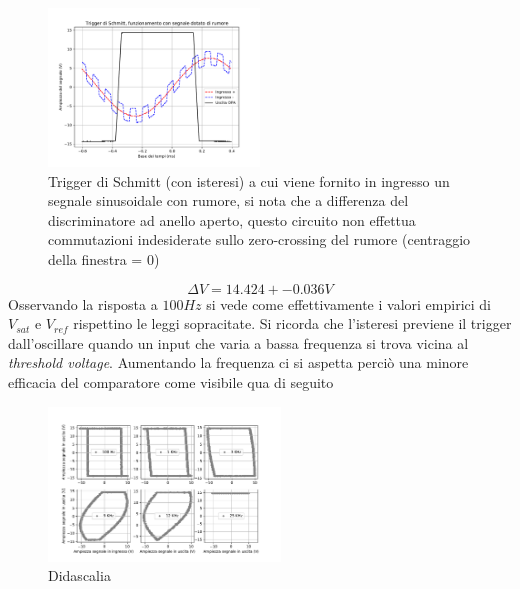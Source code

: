 \documentclass[journal]{IEEEtran}
\begin{document}
\begin{figure}[H]%
\begin {center}
\includegraphics[width=0.50\textwidth]{analysis/output/trigger2.pdf}
\caption{Trigger di Schmitt (con isteresi) a cui viene fornito in ingresso un segnale sinusoidale con rumore, si nota che a differenza del discriminatore ad anello aperto, questo circuito non effettua commutazioni indesiderate sullo zero-crossing del rumore (centraggio della finestra = 0)}
\label{fig:trigger-ok}
\end {center}
\end{figure}


\[\Delta V  = 14.424 +- 0.036  V \]
Osservando la risposta a $100 Hz$ si vede come effettivamente i valori empirici di $V_{sat}$ e $V_{ref}$ rispettino le leggi sopracitate.
Si ricorda che l'isteresi previene il trigger dall'oscillare quando un input che varia a bassa frequenza si trova vicina al \textit{threshold voltage}. Aumentando la frequenza ci si aspetta perciò una minore efficacia del comparatore come visibile qua di seguito
\begin{figure}[H]%
\begin {center}
\includegraphics[trim = {50pt 0 0 0}, width=0.55\textwidth]{analysis/output/OPA-trigger-histeresis-table.pdf}
\caption{Didascalia}
\label{fig:hyst-table}
\end {center}
\end{figure}
\end{document}
